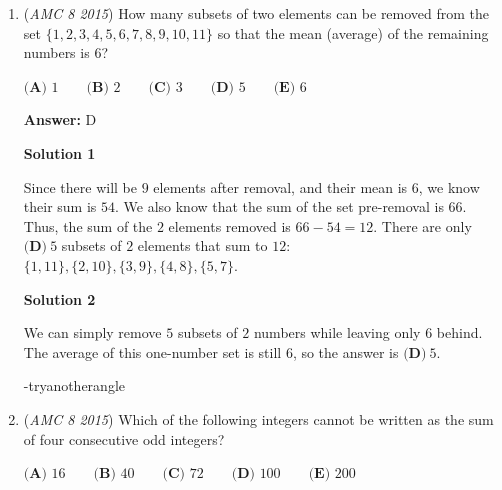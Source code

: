 \begin{enumerate}
 --LarryFlora

 



\textbf{Solution 4}

Our first case are lines on the same plane. There are two pairs of parallel lines for a square, and there are 6 squares, which give us $6\cdot2=12$ cases.

 The next cases we need to analyze are the parallel lines on opposite planes (lines such as $\overline{EF}\text{ and } \overline{DC}$). There are 2 pairs for every 2 planes, and there are 6 planes in total, giving us $2\cdot3=6$ cases.

 Adding up the cases, we get $12+6 = \boxed{\textbf{(C) } 18}$



	\item (\textit{AMC 8 2015}) How many subsets of two elements can be removed from the set $\{1, 2, 3, 4, 5, 6, 7, 8, 9, 10, 11\}$ so that the mean (average) of the remaining numbers is $6$?


 $\textbf{(A)}\text{ 1}\qquad\textbf{(B)}\text{ 2}\qquad\textbf{(C)}\text{ 3}\qquad\textbf{(D)}\text{ 5}\qquad\textbf{(E)}\text{ 6}$

 \textbf{Answer: }D



\textbf{Solution 1}

Since there will be $9$ elements after removal, and their mean is $6$, we know their sum is $54$. We also know that the sum of the set pre-removal is $66$. Thus, the sum of the $2$ elements removed is $66-54=12$. There are only $\boxed{\textbf{(D)}~5}$ subsets of $2$ elements that sum to $12$: $\{1,11\}, \{2,10\}, \{3, 9\}, \{4, 8\}, \{5, 7\}$.

 



\textbf{Solution 2}

We can simply remove $5$ subsets of $2$ numbers while leaving only $6$ behind. The average of this one-number set is still $6$, so the answer is $\boxed{\textbf{(D)}~5}$.

 -tryanotherangle

 


	\item (\textit{AMC 8 2015}) Which of the following integers cannot be written as the sum of four consecutive odd integers?


 $\textbf{(A)}\text{ 16}\qquad\textbf{(B)}\text{ 40}\qquad\textbf{(C)}\text{ 72}\qquad\textbf{(D)}\text{ 100}\qquad\textbf{(E)}\text{ 200}$


\end{enumerate}
